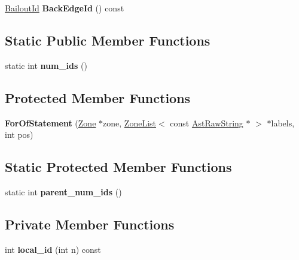 \begin{DoxyCompactItemize}
\item 
\hyperlink{classv8_1_1internal_1_1_bailout_id}{Bailout\+Id} {\bfseries Back\+Edge\+Id} () const \hypertarget{classv8_1_1internal_1_1_for_of_statement_a938c960445bc47bd62f9d03a4e8943db}{}\label{classv8_1_1internal_1_1_for_of_statement_a938c960445bc47bd62f9d03a4e8943db}

\end{DoxyCompactItemize}
\subsection*{Static Public Member Functions}
\begin{DoxyCompactItemize}
\item 
static int {\bfseries num\+\_\+ids} ()\hypertarget{classv8_1_1internal_1_1_for_of_statement_ae1803e55fffbba95e55278c42d173183}{}\label{classv8_1_1internal_1_1_for_of_statement_ae1803e55fffbba95e55278c42d173183}

\end{DoxyCompactItemize}
\subsection*{Protected Member Functions}
\begin{DoxyCompactItemize}
\item 
{\bfseries For\+Of\+Statement} (\hyperlink{classv8_1_1internal_1_1_zone}{Zone} $\ast$zone, \hyperlink{classv8_1_1internal_1_1_zone_list}{Zone\+List}$<$ const \hyperlink{classv8_1_1internal_1_1_ast_raw_string}{Ast\+Raw\+String} $\ast$ $>$ $\ast$labels, int pos)\hypertarget{classv8_1_1internal_1_1_for_of_statement_ad1442ea5e9c485a5cc3fbe6d9cddd3d6}{}\label{classv8_1_1internal_1_1_for_of_statement_ad1442ea5e9c485a5cc3fbe6d9cddd3d6}

\end{DoxyCompactItemize}
\subsection*{Static Protected Member Functions}
\begin{DoxyCompactItemize}
\item 
static int {\bfseries parent\+\_\+num\+\_\+ids} ()\hypertarget{classv8_1_1internal_1_1_for_of_statement_a97b607bd668eda6450ba474e3b565222}{}\label{classv8_1_1internal_1_1_for_of_statement_a97b607bd668eda6450ba474e3b565222}

\end{DoxyCompactItemize}
\subsection*{Private Member Functions}
\begin{DoxyCompactItemize}
\item 
int {\bfseries local\+\_\+id} (int n) const \hypertarget{classv8_1_1internal_1_1_for_of_statement_a50aeace6bc29f886a1bdd98db7568e50}{}\label{classv8_1_1internal_1_1_for_of_statement_a50aeace6bc29f886a1bdd98db7568e50}

\end{DoxyCompactItemize}
